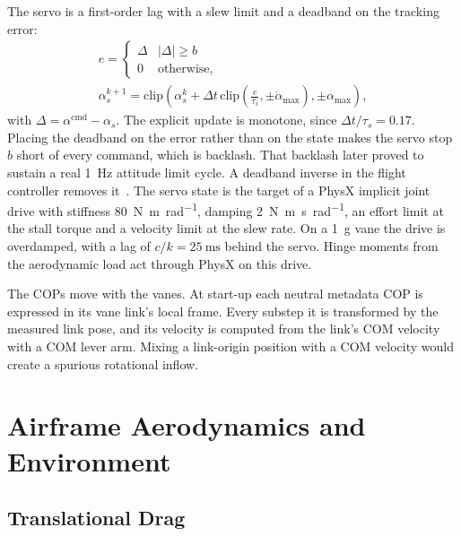 \documentclass[journal]{IEEEtran}
\begin{document}
The servo is a first-order lag with a slew limit and a deadband on the tracking error:
\begin{gather}
e = \begin{cases}\Delta & |\Delta| \ge b\\ 0 & \text{otherwise},\end{cases} \nonumber\\
\alpha_s^{k+1} = \mathrm{clip}\!\left(\alpha_s^{k} + \Delta t\,\mathrm{clip}\!\left(\tfrac{e}{\tau_s}, \pm\dot\alpha_{\max}\right), \pm\alpha_{\max}\right),
\label{eq:servo}
\end{gather}
with $\Delta = \alpha^{\text{cmd}} - \alpha_s$.
The explicit update is monotone, since $\Delta t/\tau_s = 0.17$.
Placing the deadband on the error rather than on the state makes the servo stop $b$ short of every command, which is backlash.
That backlash later proved to sustain a real \SI{1}{\hertz} attitude limit cycle.
A deadband inverse in the flight controller removes it~\cite{tang2026rl}.
The servo state is the target of a PhysX implicit joint drive with stiffness \SI{80}{\newton\metre\per\radian}, damping \SI{2}{\newton\metre\second\per\radian}, an effort limit at the stall torque and a velocity limit at the slew rate.
On a \SI{1}{\gram} vane the drive is overdamped, with a lag of $c/k = \SI{25}{\milli\second}$ behind the servo.
Hinge moments from the aerodynamic load act through PhysX on this drive.

The COPs move with the vanes.
At start-up each neutral metadata COP is expressed in its vane link's local frame.
Every substep it is transformed by the measured link pose, and its velocity is computed from the link's COM velocity with a COM lever arm.
Mixing a link-origin position with a COM velocity would create a spurious rotational inflow.

\section{Airframe Aerodynamics and Environment}
\label{sec:airframe}

\subsection{Translational Drag}
\label{sec:drag}
\end{document}
